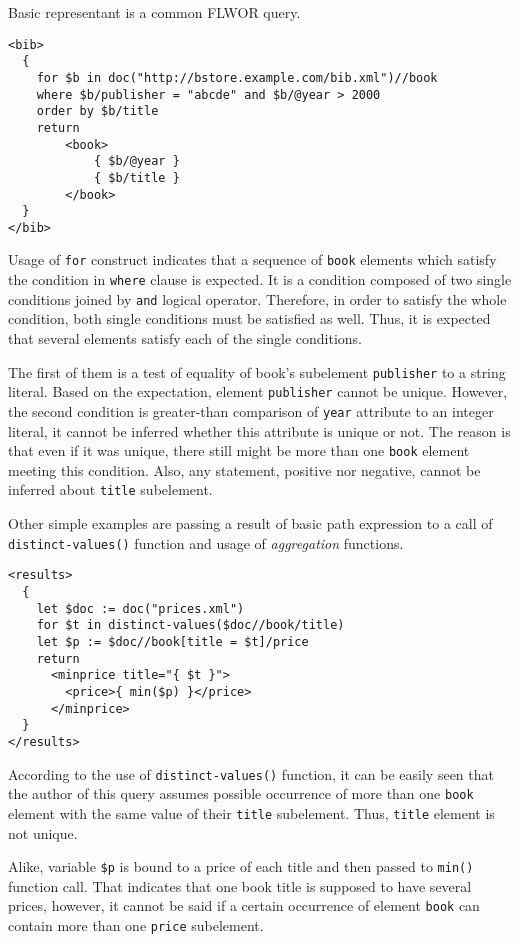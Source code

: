 Basic representant is a common FLWOR query.

\begin{verbatim}
<bib>
  {
    for $b in doc("http://bstore.example.com/bib.xml")//book
    where $b/publisher = "abcde" and $b/@year > 2000
    order by $b/title
    return
        <book>
            { $b/@year }
            { $b/title }
        </book>
  }
</bib>
\end{verbatim}

Usage of \texttt{for} construct indicates that a sequence of \texttt{book} elements which satisfy the condition in \texttt{where} clause is expected. It is a condition composed of two single conditions joined by \texttt{and} logical operator. Therefore, in order to satisfy the whole condition, both single conditions must be satisfied as well. Thus, it is expected that several elements satisfy each of the single conditions.

The first of them is a test of equality of book's subelement \texttt{publisher} to a string literal. Based on the expectation, element \texttt{publisher} cannot be unique. However, the second condition is greater-than comparison of \texttt{year} attribute to an integer literal, it cannot be inferred whether this attribute is unique or not. The reason is that even if it was unique, there still might be more than one \texttt{book} element meeting this condition. Also, any statement, positive nor negative, cannot be inferred about \texttt{title} subelement.

Other simple examples are passing a result of basic path expression to a call of \texttt{distinct-values()} function and usage of \emph{aggregation} functions.

\begin{verbatim}
<results>
  {
    let $doc := doc("prices.xml")
    for $t in distinct-values($doc//book/title)
    let $p := $doc//book[title = $t]/price
    return
      <minprice title="{ $t }">
        <price>{ min($p) }</price>
      </minprice>
  }
</results>
\end{verbatim}

According to the use of \texttt{distinct-values()} function, it can be easily seen that the author of this query assumes possible occurrence of more than one \texttt{book} element with the same value of their \texttt{title} subelement. Thus, \texttt{title} element is not unique.

Alike, variable \texttt{\$p} is bound to a price of each title and then passed to \texttt{min()} function call. That indicates that one book title is supposed to have several prices, however, it cannot be said if a certain occurrence of element \texttt{book} can contain more than one \texttt{price} subelement.


